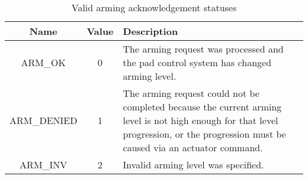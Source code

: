 \begin{table}
    \centering
    \begin{tabular}{| c | c | p{4in} |}
        \hline
        \textbf{Name} & \textbf{Value} & \textbf{Description}                                                                  \\
        \hline
        ARM\_OK       & 0              & The arming request was processed and the pad control system has changed arming level. \\
        \hline
        ARM\_DENIED   & 1              & The arming request could not be completed because the current arming level is
        not high enough for that level progression, or the progression must be caused via an actuator command.                 \\
        \hline
        ARM\_INV      & 2              & Invalid arming level was specified.                                                   \\
        \hline
    \end{tabular}
    \caption{Valid arming acknowledgement statuses}
    \label{tbl:arming-statuses}
\end{table}
